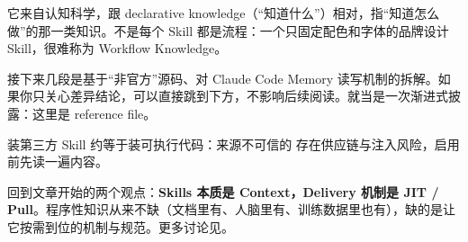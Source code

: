 \documentclass{onepoem}   %
\begin{document}
\begin{notebox}
它来自认知科学，跟 declarative knowledge（``知道什么''）相对，指``知道怎么做''的那一类知识。不是每个 Skill 都是流程：一个只固定配色和字体的品牌设计 Skill，很难称为 Workflow Knowledge。
\end{notebox}

\begin{infobox}[可跳过的深水区]
接下来几段是基于``非官方''源码、对 Claude Code Memory 读写机制的拆解。如果你只关心差异结论，可以直接跳到下方，不影响后续阅读。就当是一次渐进式披露：这里是 reference file。
\end{infobox}

\begin{warnbox}
装第三方 Skill 约等于装可执行代码：来源不可信的  存在供应链与注入风险，启用前先读一遍内容。
\end{warnbox}

回到文章开始的两个观点：\textbf{Skills 本质是 Context，Delivery 机制是 JIT / Pull}。程序性知识从来不缺（文档里有、人脑里有、训练数据里也有），缺的是让它按需到位的机制与规范。更多讨论见。
\end{document}
